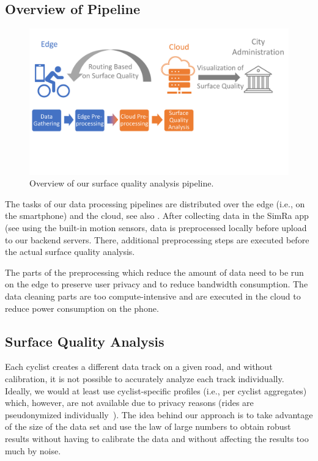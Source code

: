 \subsection{Overview of Pipeline}
\label{subsec:overview_of_pipeline}
\begin{figure}
    \centering
    \includegraphics[width=\columnwidth]{fig/overview.pdf}
    \caption{%
        Overview of our surface quality analysis pipeline.
    }%
    \label{fig:overview}
\end{figure}
The tasks of our data processing pipelines are distributed over the edge (i.e., on the smartphone) and the cloud, see also .
After collecting data in the SimRa app (see  using the built-in motion sensors, data is preprocessed locally before upload to our backend servers.
There, additional preprocessing steps are executed before the actual surface quality analysis.

The parts of the preprocessing which reduce the amount of data need to be run on the edge to preserve user privacy and to reduce bandwidth consumption.
The data cleaning parts are too compute-intensive and are executed in the cloud to reduce power consumption on the phone.

\subsection{Surface Quality Analysis}
\label{subsec:surface_quality_analysis}
Each cyclist creates a different data track on a given road, and without calibration, it is not possible to accurately analyze each track individually.
Ideally, we would at least use cyclist-specific profiles (i.e., per cyclist aggregates) which, however, are not available due to privacy reasons (rides are pseudonymized individually~\cite{karakaya2020simra}).
The idea behind our approach is to take advantage of the size of the data set and use the law of large numbers to obtain robust results without having to calibrate the data and without affecting the results too much by noise.

